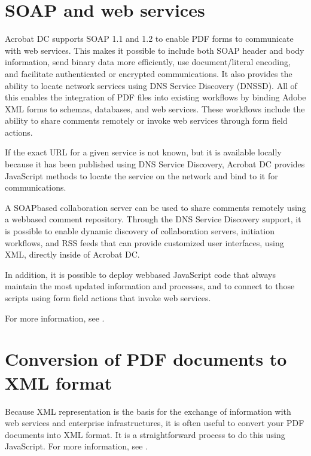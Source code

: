 \documentclass[letterpaper,12pt,english,openany,oneside]{sphinxmanual}
\begin{document}
\section{SOAP and web services}
\label{\detokenize{Overview_XML:soap-and-web-services}}
Acrobat DC supports SOAP 1.1 and 1.2 to enable PDF forms to communicate with web services. This makes it possible to include both SOAP header and body information, send binary data more efficiently, use document/literal encoding, and facilitate authenticated or encrypted communications. It also provides the ability to locate network services using DNS Service Discovery (DNS\sphinxhyphen{}SD). All of this enables the integration of PDF files into existing workflows by binding Adobe XML forms to schemas, databases, and web services. These workflows include the ability to share comments remotely or invoke web services through form field actions.

If the exact URL for a given service is not known, but it is available locally because it has been published using DNS Service Discovery, Acrobat DC provides JavaScript methods to locate the service on the network and bind to it for communications.

A SOAP\sphinxhyphen{}based collaboration server can be used to share comments remotely using a web\sphinxhyphen{}based comment repository. Through the DNS Service Discovery support, it is possible to enable dynamic discovery of collaboration servers, initiation workflows, and RSS feeds that can provide customized user interfaces, using XML, directly inside of Acrobat DC.

In addition, it is possible to deploy web\sphinxhyphen{}based JavaScript code that always maintain the most updated information and processes, and to connect to those scripts using form field actions that invoke web services.

For more information, see  .




\section{Conversion of PDF documents to XML format}
\label{\detokenize{Overview_XML:conversion-of-pdf-documents-to-xml-format}}
Because XML representation is the basis for the exchange of information with web services and enterprise infrastructures, it is often useful to convert your PDF documents into XML format. It is a straightforward process to do this using JavaScript. For more information, see  .
\end{document}
